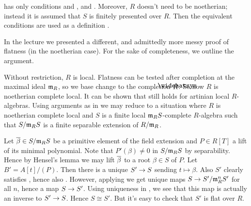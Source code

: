 \begin{rem}
	\cite[Arcata]{sga4.5} has only conditions  and , and . Moreover, $R$ doesn't need to be noetherian; instead it is assumed that $S$ is finitely presented over $R$. Then the equivalent conditions are used as a definition .
\end{rem}
\begin{rem*}
	In the lecture we presented a different, and admittedly more messy proof of flatness (in the noetherian case). For the sake of completeness, we outline the argument.
	
	Without restriction, $R$ is local. Flatness can be tested after completion at the maximal ideal $\mathfrak{m}_R$, so we base change to the completion $\roof{R}$. So now $R$ is noetherian complete local. It can be shown that  still holds for artinian local $R$-algebras. Using arguments as in \cite[15--17]{jacobians} we may reduce to a situation where $R$ is noetherian complete local and $S$ is a finite local $\mathfrak{m}_RS$-complete $R$-algebra such that $S/\mathfrak{m}_RS$ is a finite separable extension of $R/\mathfrak{m}_R$.
	
	Let $\ov{\beta}\in S/\mm_RS$ be a primitive element of the field extension and $P\in R[T]$ a lift of its minimal polynomial. Note that $P'(\beta)\neq 0$ in $S/\mathfrak{m}_RS$ by separability. Hence by Hensel's lemma we may lift $\ov{\beta}$ to a root $\beta\in S$ of $P$. Let $B'=A[t]/(P)$. Then there is a unique $S'\morphism S$ sending $t\mapsto \beta$. Also $S'$ clearly satisfies , hence also . However, applying  we get unique maps $S\morphism S'/\mm_R^nS'$ for all $n$, hence a map $S\morphism S'$. Using uniqueness in , we see that this map is actually an inverse to $S'\morphism S$. Hence $S\cong S'$. But it's easy to check that $S'$ is flat over $R$.
\end{rem*}
